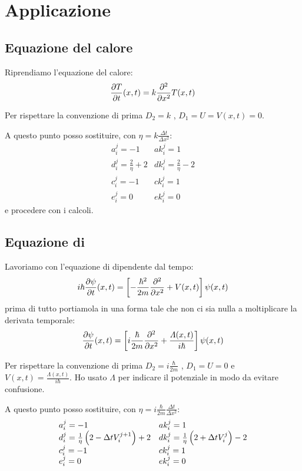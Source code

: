 \section{Applicazione}
\subsection{Equazione del calore}
Riprendiamo l'equazione del calore:
\begin{equation}
\frac{\partial T}{\partial t}(x,t) =k\frac{\partial ^2}{\partial x^2}T(x,t)
\end{equation}

Per rispettare la convenzione di prima $D_2 = k$ , $D_1 = U = V(x,t) = 0$. 


A questo punto posso sostituire, con $\eta = k\frac{\Delta t}{\Delta x^2}$:
\begin{equation}\label{eq:pararametriHeat}
\begin{array}{ll}
a_i^j = -1            & ak_i^j =1\\
d_i^j = \frac2\eta +2 & dk_i^j = \frac2\eta -2 \\
c_i^j = -1             & ck_i^j =1\\
e_i^j = 0             & ek_i^j =0
\end{array}
\end{equation}
e procedere con i calcoli.
\subsection{Equazione di \Schrodinger}
Lavoriamo con l'equazione di \Schrodinger  dipendente dal tempo:
\begin{equation}
i\hbar\frac{\partial \psi}{\partial t}(x,t) =\left[ -\frac{\hbar^2}{2m}\frac{\partial ^2}{\partial x^2}+V(x,t) \right] \psi(x,t)
\end{equation}
prima di tutto portiamola in una forma tale che non ci sia nulla a moltiplicare la derivata temporale:
\begin{equation}
\frac{\partial \psi}{\partial t}(x,t) =\left[ i\frac{\hbar}{2m}\frac{\partial ^2}{\partial x^2}+\frac{\varLambda(x,t)}{i\hbar} \right] {\psi(x,t)}
\end{equation} 

Per rispettare la convenzione di prima $D_2 = i\frac{\hbar}{2m}$ , $D_1 = U = 0$ e $V(x,t) = \frac{\varLambda(x,t)}{i\hbar}$. Ho usato $\varLambda$ per indicare il potenziale in modo da evitare confusione.


A questo punto posso sostituire, con $\eta = i\frac{\hbar}{2m}\frac{\Delta t}{\Delta x^2}$:
\begin{equation}\label{eq:pararametriSC}
\begin{array}{ll}
a_i^j = -1            & ak_i^j =1\\
d_i^j = \frac1\eta\left( 2-\Delta t V_i^{j+1} \right) +2 & dk_i^j = \frac1\eta\left( 2+\Delta tV_i^{j} \right) -2 \\
c_i^j = -1             & ck_i^j =1\\
e_i^j = 0             & ek_i^j =0
\end{array}
\end{equation}